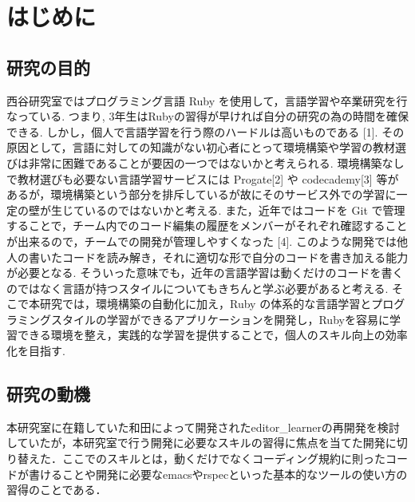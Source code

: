 \chapter{はじめに}\label{ux306fux3058ux3081ux306b}

    \section{研究の目的}\label{ux7814ux7a76ux306eux76eeux7684}

    西谷研究室ではプログラミング言語 Ruby を使用して，言語学習や卒業研究を行なっている. つまり, 3年生はRubyの習得が早ければ自分の研究の為の時間を確保できる. しかし，個人で言語学習を行う際のハードルは高いものである [1]. その原因として，言語に対しての知識がない初心者にとって環境構築や学習の教材選びは非常に困難であることが要因の一つではないかと考えられる. 環境構築なしで教材選びも必要ない言語学習サービスには Progate[2] や codecademy[3] 等があるが，環境構築という部分を排斥しているが故にそのサービス外での学習に一定の壁が生じているのではないかと考える.
また，近年ではコードを Git で管理することで，チーム内でのコード編集の履歴をメンバーがそれぞれ確認することが出来るので，チームでの開発が管理しやすくなった [4]. このような開発では他人の書いたコードを読み解き，それに適切な形で自分のコードを書き加える能力が必要となる. そういった意味でも，近年の言語学習は動くだけのコードを書くのではなく言語が持つスタイルについてもきちんと学ぶ必要があると考える.
そこで本研究では，環境構築の自動化に加え，Ruby の体系的な言語学習とプログラミングスタイルの学習ができるアプリケーションを開発し，Rubyを容易に学習できる環境を整え，実践的な学習を提供することで，個人のスキル向上の効率化を目指す.


    \section{研究の動機}\label{ux7814ux7a76ux306eux52d5ux6a5f}

    本研究室に在籍していた和田によって開発されたeditor\_learnerの再開発を検討していたが，本研究室で行う開発に必要なスキルの習得に焦点を当てた開発に切り替えた．ここでのスキルとは，動くだけでなくコーディング規約に則ったコードが書けることや開発に必要なemacsやrspecといった基本的なツールの使い方の習得のことである．

    

